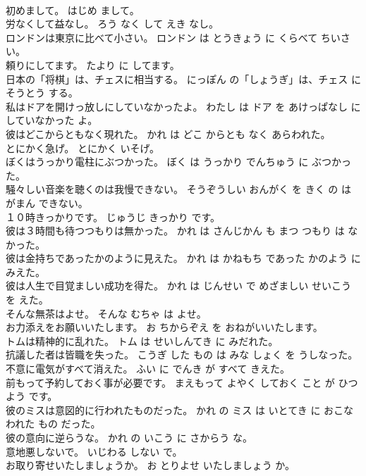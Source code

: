 \documentclass[8pt]{extreport}
\begin{document}
\begin{CJK}{UTF8}{min}
\\	初めまして。	はじめ まして。	
\\	労なくして益なし。	ろう なく して えき なし。	
\\	ロンドンは東京に比べて小さい。	ロンドン は とうきょう に くらべて ちいさい。	
\\	頼りにしてます。	たより に してます。	
\\	日本の「将棋」は、チェスに相当する。	にっぽん の「しょうぎ」は、チェス に そうとう する。	
\\	私はドアを開けっ放しにしていなかったよ。	わたし は ドア を あけっぱなし に していなかった よ。	
\\	彼はどこからともなく現れた。	かれ は どこ からとも なく あらわれた。	
\\	とにかく急げ。	とにかく いそげ。	
\\	ぼくはうっかり電柱にぶつかった。	ぼく は うっかり でんちゅう に ぶつかった。	
\\	騒々しい音楽を聴くのは我慢できない。	そうぞうしい おんがく を きく の は がまん できない。	
\\	１０時きっかりです。	じゅうじ きっかり です。	
\\	彼は３時間も待つつもりは無かった。	かれ は さんじかん も まつ つもり は なかった。	
\\	彼は金持ちであったかのように見えた。	かれ は かねもち であった かのよう に みえた。	
\\	彼は人生で目覚ましい成功を得た。	かれ は じんせい で めざましい せいこう を えた。	
\\	そんな無茶はよせ。	そんな むちゃ は よせ。	
\\	お力添えをお願いいたします。	お ちからぞえ を おねがいいたします。	
\\	トムは精神的に乱れた。	トム は せいしんてき に みだれた。	
\\	抗議した者は皆職を失った。	こうぎ した もの は みな しょく を うしなった。	
\\	不意に電気がすべて消えた。	ふい に でんき が すべて きえた。	
\\	前もって予約しておく事が必要です。	まえもって よやく しておく こと が ひつよう です。	
\\	彼のミスは意図的に行われたものだった。	かれ の ミス は いとてき に おこなわれた もの だった。	
\\	彼の意向に逆らうな。	かれ の いこう に さからう な。	
\\	意地悪しないで。	いじわる しない で。	
\\	お取り寄せいたしましょうか。	お とりよせ いたしましょう か。	

\end{CJK}
\end{document}
